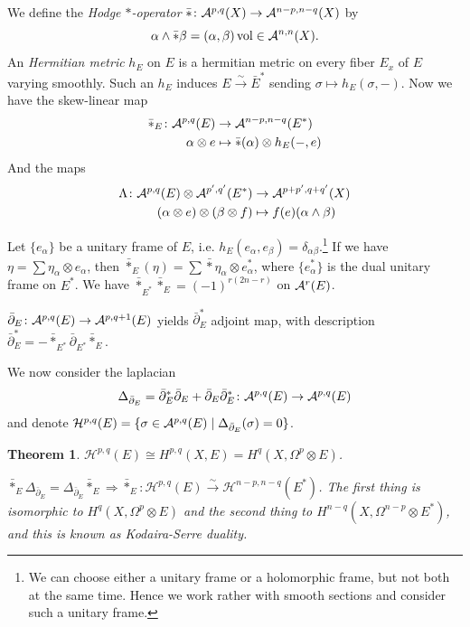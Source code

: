 \documentclass[A4paper, british]{amsart}
\theoremstyle{darkgreentheorem}
\newtheorem{thm}{Theorem}[section]
\theoremstyle{darkbluedefinition}
\theoremstyle{darkredexample}
\theoremstyle{remark}
\DeclareMathOperator{\vol}{vol}
\renewcommand{\H}{\mathcal{H}}
\newcommand{\1}{\mathbbm{1}}
\newcommand{\ot}{\otimes}
\begin{document}
We define the \textit{Hodge $*$-operator} $\bar{*}\colon \mathcal{A}^{p,q}(X)\to \mathcal{A}^{n-p,n-q}(X)$ by
\[ \alpha\wedge \bar{*}\beta = (\alpha,\beta)\vol \in \calA^{n,n}(X).\]
An \textit{Hermitian metric} $h_{E}$ on $E$ is a hermitian metric on every fiber $E_{x}$ of $E$ varying smoothly.
Such an $h_{E}$ induces $E\xrightarrow{\sim} \bar{E}^{*}$ sending $\sigma \mapsto h_{E}(\sigma,-)$.
Now we have the skew-linear map
\begin{align*}
    \bar{*}_{E}\colon \calA^{p,q}(E) &\to \calA^{n-p,n-q}(E^{*}) \\
    \alpha \ot e &\mapsto \bar{*}(\alpha)\ot h_{E}(-,e)
\end{align*}
And the maps
\begin{align*}
    \Lambda \colon \calA^{p,q}(E)\ot \calA^{p',q'}(E^{*}) & \to \calA^{p+p',q+q'}(X) \\
    (\alpha \ot e)\ot (\beta \ot f) & \mapsto f(e)(\alpha\wedge \beta)
\end{align*}

Let $\{ e_{\alpha }\}$ be a unitary frame of $E$, i.e. $h_{E}(e_{\alpha},e_{\beta})=\delta_{\alpha\beta}$.\footnote{We can choose either a unitary frame or a holomorphic frame, but not both at the same time. Hence we work rather with smooth sections and consider such a unitary frame.}
If we have $\eta=\sum \eta_{\alpha}\ot e_{\alpha}$, then $\bar{*}_{E}(\eta)=\sum \bar{*}\eta_{\alpha}\ot e_{\alpha}^{*}$, where $\{ e_{\alpha}^{*}\}$ is the dual unitary frame on $E^{*}$.
We have $\bar{*}_{E^{*}}\bar{*}_{E}=(-1)^{r(2n-r)}$ on $\mathcal{A}^{r}(E)$.

$\bar{\partial }_{E}\colon \mathcal{A}^{p,q}(E)\to \mathcal{A}^{p,q+1}(E)$ yields $\bar{\partial }_{E}^{*}$ adjoint map, with description $\bar{\partial }_{E}^{*}=-\bar{*}_{E^{*}}\bar{\partial }_{E^{*}}\bar{*}_{E}$.

We now consider the laplacian
\[\Delta_{\bar{\partial}_{E}}=\bar{\partial}_{E}^{*}\bar{\partial}_{E} +\bar{\partial }_{E}\bar{\partial}_{E}^{*}\colon \mathcal{A}^{p,q}(E)\to \mathcal{A}^{p,q}(E)\]
and denote $\H^{p,q}(E)=\{\sigma \in \calA^{p,q}(E)\mid \Delta_{\bar{\partial }_{E}}(\sigma )=0\}$.

\begin{thm}
    $\H^{p,q}(E)\cong H^{p,q}(X,E)=H^{q}(X,\Omega^{p}\ot E)$.
    
    $\bar{*}_{E}\Delta_{\bar{\partial}_{E}}=\Delta_{\bar{\partial }_{E}}\bar{*}_{E} \Rightarrow \bar{*}_{E}\colon \H^{p,q}(E)\xrightarrow{\sim}\H^{n-p,n-q}(E^{*})$.
    The first thing is isomorphic to $H^{q}(X,\Omega^{p}\ot E)$ and the second thing to $H^{n-q}(X,\Omega^{n-p}\ot E^{*})$, and this is known as \textit{Kodaira-Serre duality}.
\end{thm}
\end{document}
